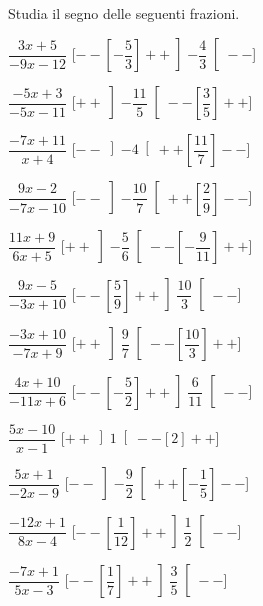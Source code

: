 \begin{esercizio}\label{ese:dis_8}
 Studia il segno delle seguenti frazioni.
\begin{multicols}{2}
 \begin{enumeratea}
  \item  $\dfrac{3 x +5}{-9 x -12}$ \hfill 
  [$--\left [-\dfrac{5}{3} \right ]++\left ]-\dfrac{4}{3} \right [--$]
  \item  $\dfrac{-5 x +3}{-5 x -11}$ \hfill 
  [$++\left ]-\dfrac{11}{5} \right [--\left [\dfrac{3}{5} \right ]++$]
  \item  $\dfrac{-7 x +11}{x +4}$ \hfill 
  [$--\left ]-4 \right [++\left [\dfrac{11}{7} \right ]--$]
  \item  $\dfrac{9 x -2}{-7 x -10}$ \hfill 
  [$--\left ]-\dfrac{10}{7} \right [++\left [\dfrac{2}{9} \right ]--$]
  \item  $\dfrac{11 x +9}{6 x +5}$ \hfill 
  [$++\left ]-\dfrac{5}{6} \right [--\left [-\dfrac{9}{11} \right ]++$]
  \item  $\dfrac{9 x -5}{-3 x +10}$ \hfill 
  [$--\left [\dfrac{5}{9} \right ]++\left ]\dfrac{10}{3} \right [--$]
  \item  $\dfrac{-3 x +10}{-7 x +9}$ \hfill 
  [$++\left ]\dfrac{9}{7} \right [--\left [\dfrac{10}{3} \right ]++$]
  \item  $\dfrac{4 x +10}{-11 x +6}$ \hfill 
  [$--\left [-\dfrac{5}{2} \right ]++\left ]\dfrac{6}{11} \right [--$]
  \item  $\dfrac{5 x -10}{x -1}$ \hfill 
  [$++\left ]1 \right [--\left [2 \right ]++$]
  \item  $\dfrac{5 x +1}{-2 x -9}$ \hfill 
  [$--\left ]-\dfrac{9}{2} \right [++\left [-\dfrac{1}{5} \right ]--$]
  \item  $\dfrac{-12 x +1}{8 x -4}$ \hfill 
  [$--\left [\dfrac{1}{12} \right ]++\left ]\dfrac{1}{2} \right [--$]
  \item  $\dfrac{-7 x +1}{5 x -3}$ \hfill 
  [$--\left [\dfrac{1}{7} \right ]++\left ]\dfrac{3}{5} \right [--$]
 \end{enumeratea}
\end{multicols}
\end{esercizio}

\subsubsection*{}

